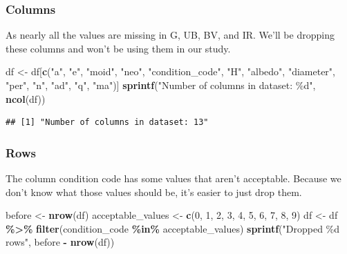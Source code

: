 \documentclass[
]{article}
\newenvironment{Shaded}{\begin{snugshade}}{\end{snugshade}}
\newcommand{\DecValTok}[1]{\textcolor[rgb]{0.00,0.00,0.81}{#1}}
\newcommand{\FunctionTok}[1]{\textcolor[rgb]{0.13,0.29,0.53}{\textbf{#1}}}
\newcommand{\NormalTok}[1]{#1}
\newcommand{\OtherTok}[1]{\textcolor[rgb]{0.56,0.35,0.01}{#1}}
\newcommand{\SpecialCharTok}[1]{\textcolor[rgb]{0.81,0.36,0.00}{\textbf{#1}}}
\newcommand{\StringTok}[1]{\textcolor[rgb]{0.31,0.60,0.02}{#1}}
\begin{document}
\hypertarget{columns}{%
\subsubsection{Columns}\label{columns}}

As nearly all the values are missing in G, UB, BV, and IR. We'll be
dropping these columns and won't be using them in our study.

\begin{Shaded}
\begin{Highlighting}[]
\NormalTok{df }\OtherTok{\textless{}{-}}\NormalTok{ df[}\FunctionTok{c}\NormalTok{(}\StringTok{"a"}\NormalTok{, }\StringTok{"e"}\NormalTok{, }\StringTok{"moid"}\NormalTok{, }\StringTok{"neo"}\NormalTok{, }\StringTok{"condition\_code"}\NormalTok{, }\StringTok{"H"}\NormalTok{, }\StringTok{"albedo"}\NormalTok{, }\StringTok{"diameter"}\NormalTok{, }
           \StringTok{"per"}\NormalTok{, }\StringTok{"n"}\NormalTok{, }\StringTok{"ad"}\NormalTok{, }\StringTok{"q"}\NormalTok{, }\StringTok{"ma"}\NormalTok{)]}
\FunctionTok{sprintf}\NormalTok{(}\StringTok{"Number of columns in dataset: \%d"}\NormalTok{, }\FunctionTok{ncol}\NormalTok{(df))}
\end{Highlighting}
\end{Shaded}

\begin{verbatim}
## [1] "Number of columns in dataset: 13"
\end{verbatim}

\hypertarget{rows}{%
\subsubsection{Rows}\label{rows}}

The column condition code has some values that aren't acceptable.
Because we don't know what those values should be, it's easier to just
drop them.

\begin{Shaded}
\begin{Highlighting}[]
\NormalTok{before }\OtherTok{\textless{}{-}} \FunctionTok{nrow}\NormalTok{(df)}
\NormalTok{acceptable\_values }\OtherTok{\textless{}{-}} \FunctionTok{c}\NormalTok{(}\DecValTok{0}\NormalTok{, }\DecValTok{1}\NormalTok{, }\DecValTok{2}\NormalTok{, }\DecValTok{3}\NormalTok{, }\DecValTok{4}\NormalTok{, }\DecValTok{5}\NormalTok{, }\DecValTok{6}\NormalTok{, }\DecValTok{7}\NormalTok{, }\DecValTok{8}\NormalTok{, }\DecValTok{9}\NormalTok{)}
\NormalTok{df }\OtherTok{\textless{}{-}}\NormalTok{ df }\SpecialCharTok{\%\textgreater{}\%} \FunctionTok{filter}\NormalTok{(condition\_code }\SpecialCharTok{\%in\%}\NormalTok{ acceptable\_values)}
\FunctionTok{sprintf}\NormalTok{(}\StringTok{"Dropped \%d rows"}\NormalTok{, before }\SpecialCharTok{{-}} \FunctionTok{nrow}\NormalTok{(df))}
\end{Highlighting}
\end{Shaded}
\end{document}
